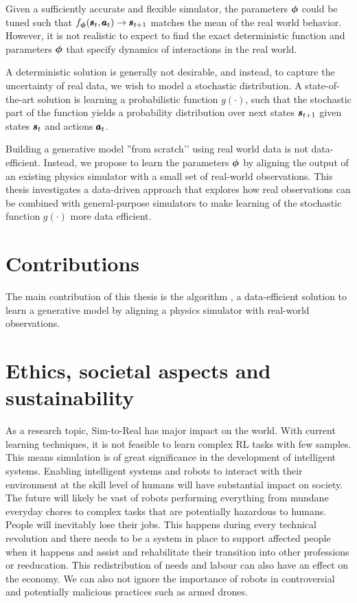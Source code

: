 Given a sufficiently accurate and flexible simulator, the parameters $\boldsymbol{\phi}$ could be tuned such that $f_{\boldsymbol{\phi}}(\pmb{s}_t, \pmb{a}_t) \rightarrow \pmb{s}_{t+1}$ matches the mean of the real world behavior. However, it is not realistic to expect to find the exact deterministic function and parameters $\boldsymbol{\phi}$ that specify dynamics of interactions in the real world.

A deterministic solution is generally not desirable, and instead, to capture the uncertainty of real data, we wish to model a stochastic distribution. A state-of-the-art solution is learning a probabilistic function $g(\cdot)$, such that the stochastic part of the function yields a probability distribution over next states $\pmb{s}_{t+1}$ given states $\pmb{s}_t$ and actions $\pmb{a}_t$.

Building a generative model ''from scratch’' using real world data is not data-efficient. Instead, we propose to learn the parameters $\boldsymbol{\phi}$ by aligning the output of an existing physics simulator with a small set of real-world observations. This thesis investigates a data-driven approach that explores how real observations can be combined with general-purpose simulators to make learning of the stochastic function $g(\cdot)$ more data efficient.


\section{Contributions}

The main contribution of this thesis is the algorithm \dettostoc{}, a data-efficient solution to learn a generative model by aligning a physics simulator with real-world observations.

\section{Ethics, societal aspects and sustainability}

As a research topic, Sim-to-Real has major impact on the world. With current learning techniques, it is not feasible to learn complex RL tasks with few samples. This means simulation is of great significance in the development of intelligent systems. Enabling intelligent systems and robots to interact with their environment at the skill level of humans will have substantial impact on society. The future will likely be vast of robots performing everything from mundane everyday chores to complex tasks that are potentially hazardous to humans. People will inevitably lose their jobs. This happens during every technical revolution and there needs to be a system in place to support affected people when it happens and assist and rehabilitate their transition into other professions or reeducation. This redistribution of needs and labour can also have an effect on the economy. We can also not ignore the importance of robots in controversial and potentially malicious practices such as armed drones.

